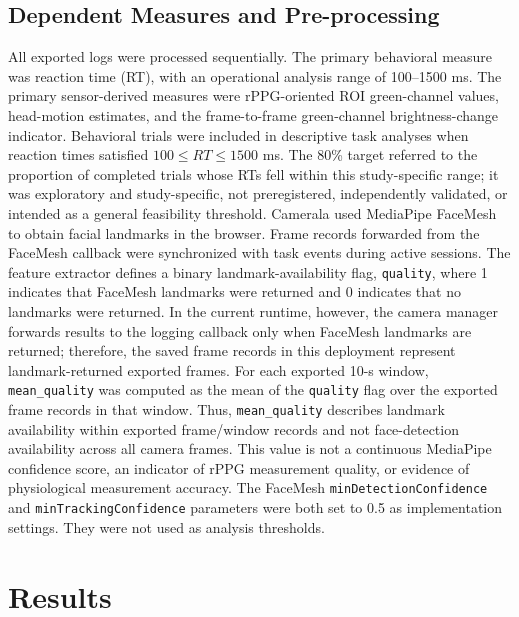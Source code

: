 \documentclass[dvipdfmx]{ehis}
\begin{document}
\subsection{Dependent Measures and Pre-processing}
All exported logs were processed sequentially.
The primary behavioral measure was reaction time (RT), with an operational analysis range of 100--1500 ms.
The primary sensor-derived measures were rPPG-oriented ROI green-channel values, head-motion estimates, and the frame-to-frame green-channel brightness-change indicator.
Behavioral trials were included in descriptive task analyses when reaction times satisfied $100 \leq RT \leq 1500$ ms.
The 80\% target referred to the proportion of completed trials whose RTs fell within this study-specific range; it was exploratory and study-specific, not preregistered, independently validated, or intended as a general feasibility threshold.
Camerala used MediaPipe FaceMesh to obtain facial landmarks in the browser.
Frame records forwarded from the FaceMesh callback were synchronized with task events during active sessions.
The feature extractor defines a binary landmark-availability flag, \texttt{quality}, where 1 indicates that FaceMesh landmarks were returned and 0 indicates that no landmarks were returned.
In the current runtime, however, the camera manager forwards results to the logging callback only when FaceMesh landmarks are returned; therefore, the saved frame records in this deployment represent landmark-returned exported frames.
For each exported 10-s window, \texttt{mean\_quality} was computed as the mean of the \texttt{quality} flag over the exported frame records in that window.
Thus, \texttt{mean\_quality} describes landmark availability within exported frame/window records and not face-detection availability across all camera frames.
This value is not a continuous MediaPipe confidence score, an indicator of rPPG measurement quality, or evidence of physiological measurement accuracy.
The FaceMesh \texttt{minDetectionConfidence} and \texttt{minTrackingConfidence} parameters were both set to 0.5 as implementation settings.
They were not used as analysis thresholds.

\section{Results}
\end{document}
